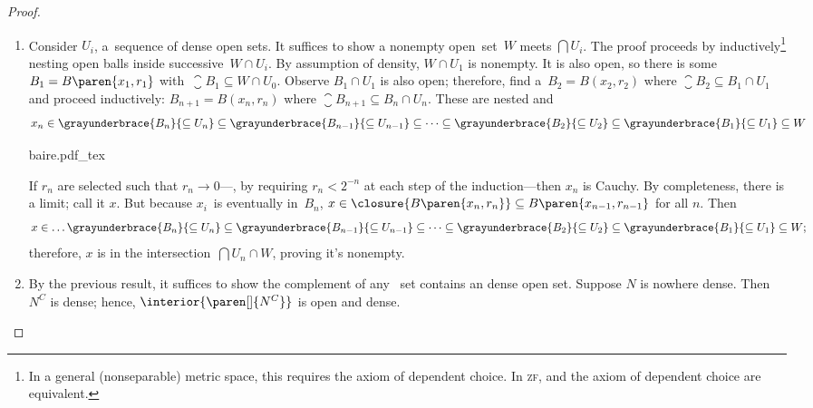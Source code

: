 \documentclass{scrartcl}
\newcommand{\ball}{B}
\begin{document}
\begin{proof} \
  \begin{enumerate}
  \item
    Consider \(U_i\), a~sequence of dense open sets. It suffices to show a nonempty open~set~\(W\)
    meets \(\bigcap U_i\). The proof proceeds by inductively\footnote{In a general (nonseparable) metric space, this requires the axiom of dependent choice. In \textsc{zf},  and the axiom of dependent choice are equivalent.\cite{wikipediabairecat}} nesting open balls inside successive~\(W\cap U_i\). By assumption of density, \(W\cap U_1\) is nonempty.
    It is also open, so there is some~\(\ball_1= \ball\paren{x_1,r_1}\) with~\(\closure{\ball_1}\subseteq W\cap U_0\).
    Observe \(\ball_1\cap U_1\) is also open; therefore, find a~\(\ball_2=\ball(x_2,r_2)\) where \(\closure{\ball_2}\subseteq \ball_1\cap U_1\) and proceed inductively: \(\ball_{n+1}=\ball(x_{n},r_{n})\) where \(\closure{\ball_{n+1}}\subseteq \ball_n\cap U_n\). These are nested and
    \[
      x_n \in \grayunderbrace{\ball_n}{\subseteq U_n}\subseteq \grayunderbrace{\ball_{n-1}}{\subseteq U_{n-1}}\subseteq\dots \subseteq
      \grayunderbrace{\ball_2}{\subseteq U_2} \subseteq \grayunderbrace{\ball_1}{\subseteq U_1} \subseteq W
    \]
    \begin{center}
      {baire.pdf_tex}
    \end{center}
    If \(r_n\) are selected such that \(r_n\to 0\)---\eg, by requiring \(r_n < 2^{-n}\) at each step of the induction---then \(x_n\) is Cauchy. By completeness, there is a limit; call it \(x\). But because \(x_i\)~is eventually in~\(\ball_n\), \(x\in \closure{\ball\paren{x_n,r_n}}\subseteq \ball\paren{x_{n-1},r_{n-1}}\) for all \(n\). Then
    \[
      x \in \dots \grayunderbrace{\ball_n}{\subseteq U_n}\subseteq \grayunderbrace{\ball_{n-1}}{\subseteq U_{n-1}}
      \subseteq\dots\subseteq  \grayunderbrace{\ball_2}{\subseteq U_2} \subseteq \grayunderbrace{\ball_1}{\subseteq U_1} \subseteq W;
    \]
    therefore, \(x\) is in the intersection~\(\bigcap U_n\cap W\), proving it's nonempty.
  \item By the previous result, it suffices to show the complement of any ~set contains an dense open set.
    Suppose \(N\) is nowhere dense. Then \(N^C\) is dense; hence, \(\interior{\paren[]{N^C}}\) is open and dense.
  \end{enumerate}
\end{proof}
\end{document}
